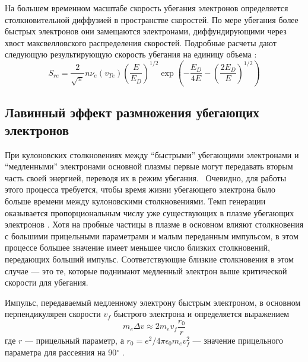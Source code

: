 На большем временном масштабе скорость убегания электронов определяется столкновительной диффузией в пространстве скоростей. По мере убегания более быстрых электронов они замещаются электронами, диффундирующими через хвост максвелловского распределения скоростей. Подробные расчеты дают следующую результирующую скорость убегания на единицу объема \cite{Wesson2004}: 
\begin{equation*}
  S_{re} = \frac{2}{ \sqrt{\pi} } n \nu_{e}(v_{Te}) \left( \frac{E}{E_D} \right)^{1/2} \exp\left( -\frac{E_D}{4 E} - \left( \frac{2 E_D }{E} \right)^{1/2} \right)
\end{equation*}



\subsection{Лавинный эффект размножения убегающих электронов}

При кулоновских столкновениях между ``быстрыми'' убегающими электронами и ``медленными'' электронами основной плазмы первые могут передавать вторым часть своей энергией, переводя их в режим убегания.~\cite{Sokolov1979} Очевидно, для работы этого процесса требуется, чтобы время жизни убегающего электрона было больше времени между кулоновскими столкновениями. Темп генерации оказывается пропорциональным числу уже существующих в плазме убегающих электронов \cite{Rozansky2012}.  Хотя на пробные частицы в плазме в основном влияют столкновения с большими прицельными параметрами и малым переданным импульсом, в этом процессе большее значение имеет меньшее число близких столкновений, передающих больший импульс. Соответствующие близкие столкновения в этом случае --- это те, которые поднимают медленный электрон выше критической скорости для убегания. 

Импульс, передаваемый медленному электрону быстрым электроном, в основном перпендикулярен скорости $v_f$ быстрого электрона и определяется выражением
\begin{equation*}
  m_e \Delta v \approx 2 m_e v_f \frac{r_0}{r}
\end{equation*}
где $r$ --- прицельный параметр, а $r_0 = e^2 / 4 \pi \epsilon_0 m_e v_f^2$ --- значение прицельного параметра для рассеяния на 90$^\circ$ \cite{Wesson2004}. 

